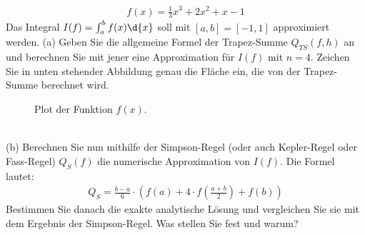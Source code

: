 \documentclass{scrartcl}
\begin{document}

	\begin{align*}
		f(x) = \frac{1}{3}x^3 + 2x^2 +x - 1
	\end{align*}
	Das Integral $I(f) = \int_{a}^{b}f(x)\d{x}$ soll mit $[a,b] = [-1,1]$ approximiert werden.
	\n
	(a)
	Geben Sie die allgemeine Formel der Trapez-Summe $Q_{TS}(f,h)$ an und berechnen Sie mit jener eine Approximation für $I(f)$ mit $n=4$.
	\n 
	Zeichen Sie in unten stehender Abbildung genau die Fläche ein, die von der Trapez-Summe berechnet wird.
	\begin{figure}[ht]
		\centering
		\caption{Plot der Funktion $f(x)$.}
	\end{figure}
	\lbreak \lbreak \lbreak
	\\
	(b)
	Berechnen Sie nun mithilfe der Simpson-Regel (oder auch Kepler-Regel oder Fass-Regel) $Q_{S}(f)$ die numerische Approximation von $I(f)$. Die Formel lautet:
	\begin{align*}
		Q_{S} = \frac{b - a}{6} \cdot \left( f(a) + 4\cdot f\left( \frac{a + b}{2} \right) + f(b) \right)
	\end{align*}
	Bestimmen Sie danach die exakte analytische Lösung und vergleichen Sie sie mit dem Ergebnis der Simpson-Regel. Was stellen Sie fest und warum?

	
	
\end{document}
